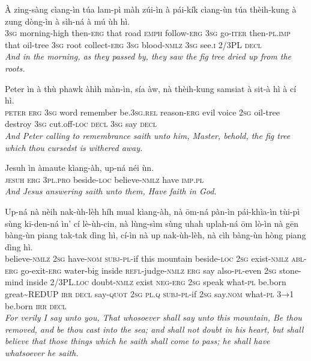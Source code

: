 \documentclass[11pt,a4paper]{article}
\begin{document}
\begin{exe}
\gll À zing-sàng cìang-ìn túa lam-pì màh zúi-ìn à pái-kík cìang-ùn túa thèih-kung à zung dòng-ìn à sìh-ná à mú ùh hì. \\
     \textsc{3sg} morning-high then-\textsc{erg} that road \textsc{emph} follow-\textsc{erg} \textsc{3sg} go-\textsc{iter} then-\textsc{pl}.\textsc{imp} that oil-tree \textsc{3sg} root collect-\textsc{erg} \textsc{3sg} blood-\textsc{nmlz} \textsc{3sg} see.\textsc{i} 2/3PL \textsc{decl} \\
\glt \textcolor{kjvcolor}{\textit{And in the morning, as they passed by, they saw the fig tree dried up from the roots.}}

\gll Peter ìn à thù phawk àhìh màn-ìn, sía àw, nà thèih-kung samsiat à sit-à hì à cí hì. \\
     \textsc{peter} \textsc{erg} \textsc{3sg} word remember be.\textsc{3sg}.\textsc{rel} reason-\textsc{erg} evil voice \textsc{2sg} oil-tree destroy \textsc{3sg} cut.off-\textsc{loc} \textsc{decl} \textsc{3sg} say \textsc{decl} \\
\glt \textcolor{kjvcolor}{\textit{And Peter calling to remembrance saith unto him, Master, behold, the fig tree which thou cursedst is withered away.}}

\gll Jesuh ìn àmaute kìang-àh, up-ná néi ùn. \\
     \textsc{jesuh} \textsc{erg} \textsc{3pl}.\textsc{pro} beside-\textsc{loc} believe-\textsc{nmlz} have \textsc{imp}.\textsc{pl} \\
\glt \textcolor{kjvcolor}{\textit{And Jesus answering saith unto them, Have faith in God.}}

\gll Up-ná nà nèih nak-ùh-lèh híh mual kìang-àh, nà ōm-ná pàn-ìn pái-khìa-ìn tùi-pì sùng kī-den-ná ìn' cí lè-ùh-cin, nà lùng-sìm sùng uhah uplah-ná ōm lò-ìn nà gēn bàng-ùn piang tak-tak dìng hì, cí-ìn nà up nak-ùh-lèh, nà cìh bàng-ùn hòng piang dìng hì. \\
     believe-\textsc{nmlz} \textsc{2sg} have-\textsc{nom} \textsc{subj}-\textsc{pl}-if this mountain beside-\textsc{loc} \textsc{2sg} exist-\textsc{nmlz} \textsc{abl}-\textsc{erg} go-exit-\textsc{erg} water-big inside \textsc{refl}-judge-\textsc{nmlz} \textsc{erg} say also-\textsc{pl}-even \textsc{2sg} stone-mind inside 2/3PL.\textsc{loc} doubt-\textsc{nmlz} exist \textsc{neg}-\textsc{erg} \textsc{2sg} speak what-\textsc{pl} be.born great\textasciitilde{}REDUP \textsc{irr} \textsc{decl} say-\textsc{quot} \textsc{2sg} \textsc{pl}.\textsc{q} \textsc{subj}-\textsc{pl}-if \textsc{2sg} say.\textsc{nom} what-\textsc{pl} \textsc{3→1} be.born \textsc{irr} \textsc{decl} \\
\glt \textcolor{kjvcolor}{\textit{For verily I say unto you, That whosoever shall say unto this mountain, Be thou removed, and be thou cast into the sea; and shall not doubt in his heart, but shall believe that those things which he saith shall come to pass; he shall have whatsoever he saith.}}


\end{exe}
\end{document}
